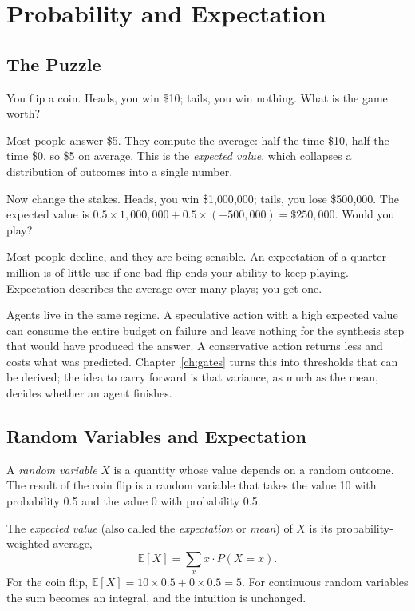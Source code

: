 \documentclass[11pt]{book}
\begin{document}
\section{Probability and Expectation}

\subsection{The Puzzle}

You flip a coin. Heads, you win \$10; tails, you win nothing. What is the game worth?

Most people answer \$5. They compute the average: half the time \$10, half the time \$0, so \$5 on average. This is the \emph{expected value}, which collapses a distribution of outcomes into a single number.

Now change the stakes. Heads, you win \$1{,}000{,}000; tails, you lose \$500{,}000. The expected value is $0.5 \times 1{,}000{,}000 + 0.5 \times (-500{,}000) = \$250{,}000$. Would you play?

Most people decline, and they are being sensible. An expectation of a quarter-million is of little use if one bad flip ends your ability to keep playing. Expectation describes the average over many plays; you get one.

Agents live in the same regime. A speculative action with a high expected value can consume the entire budget on failure and leave nothing for the synthesis step that would have produced the answer. A conservative action returns less and costs what was predicted. Chapter~\ref{ch:gates} turns this into thresholds that can be derived; the idea to carry forward is that variance, as much as the mean, decides whether an agent finishes.

\subsection{Random Variables and Expectation}

A \emph{random variable} $X$ is a quantity whose value depends on a random outcome. The result of the coin flip is a random variable that takes the value 10 with probability 0.5 and the value 0 with probability 0.5.

The \emph{expected value} (also called the \emph{expectation} or \emph{mean}) of $X$ is its probability-weighted average,
\[
\mathbb{E}[X] = \sum_x x \cdot P(X = x).
\]
For the coin flip, $\mathbb{E}[X] = 10 \times 0.5 + 0 \times 0.5 = 5$. For continuous random variables the sum becomes an integral, and the intuition is unchanged.
\end{document}
